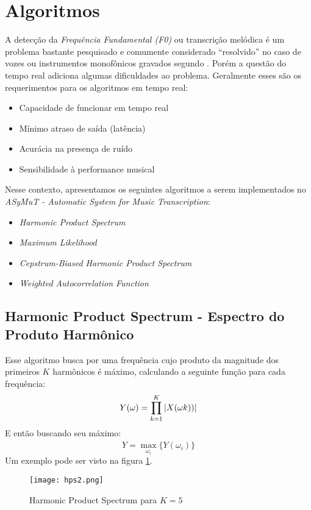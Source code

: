\section{Algoritmos}
\label{sec:algoritmos}

A detecção da \emph{Frequência Fundamental (F0)} ou transcrição melódica é um problema bastante pesquisado e comumente considerado ``resolvido'' no caso de vozes ou instrumentos monofônicos gravados segundo \cite{de2001efficient}.
Porém a questão do tempo real adiciona algumas dificuldades ao problema. Geralmente esses são os requerimentos para os algoritmos em tempo real:

\begin{itemize}
\item Capacidade de funcionar em tempo real
\item Mínimo atraso de saída (latência)
\item Acurácia na presença de ruído
\item Sensibilidade à performance musical
\end{itemize}

Nesse contexto, apresentamos os seguintes algoritmos a serem implementados no \emph{ASyMuT - Automatic System for Music Transcription}:

\begin{itemize}
\item \emph{Harmonic Product Spectrum}
\item \emph{Maximum Likelihood}
\item \emph{Cepstrum-Biased Harmonic Product Spectrum}
\item \emph{Weighted Autocorrelation Function}
\end{itemize}

\subsection{Harmonic Product Spectrum - Espectro do Produto Harmônico}

Esse algoritmo busca por uma frequência cujo produto da magnitude dos primeiros $K$ harmônicos é máximo, calculando a seguinte função para cada frequência: $$Y(\omega) = \prod _{k=1}^{K} \left\lvert X(\omega k))\right\rvert$$
E então buscando seu máximo: $$\widehat{Y} = \max\limits_{\omega_i}\{Y(\omega_i)\}$$
Um exemplo pode ser visto na figura \ref{fig:hps2}.

     \begin{figure}%
\centering
\texttt{[image: hps2.png]}
\caption{Harmonic Product Spectrum para $K=5$}
\label{fig:hps2}
\end{figure}

